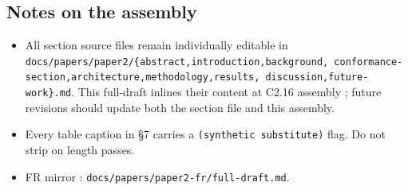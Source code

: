 \documentclass[
]{article}
\providecommand{\tightlist}{%
  \setlength{\itemsep}{0pt}\setlength{\parskip}{0pt}}
\begin{document}
\subsection{Notes on the assembly}\label{notes-on-the-assembly}

\begin{itemize}
\tightlist
\item
  All section source files remain individually editable in
  \texttt{docs/papers/paper2/\{abstract,introduction,background,\ conformance-section,architecture,methodology,results,\ discussion,future-work\}.md}.
  This full-draft inlines their content at C2.16 assembly ; future
  revisions should update both the section file and this assembly.
\item
  Every table caption in §7 carries a \texttt{(synthetic\ substitute)}
  flag. Do not strip on length passes.
\item
  FR mirror : \texttt{docs/papers/paper2-fr/full-draft.md}.
\end{itemize}
\end{document}
